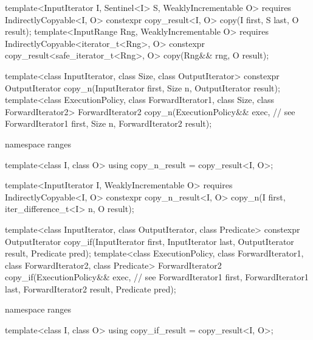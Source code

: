 \begin{addedblock}
\begin{codeblock}
{    template<InputIterator I, Sentinel<I> S, WeaklyIncrementable O>
      requires IndirectlyCopyable<I, O>
      constexpr copy_result<I, O>
        copy(I first, S last, O result);
    template<InputRange Rng, WeaklyIncrementable O>
      requires IndirectlyCopyable<iterator_t<Rng>, O>
      constexpr copy_result<safe_iterator_t<Rng>, O>
        copy(Rng&& rng, O result);
  }
\end{codeblock}\end{addedblock}\begin{codeblock}
  template<class InputIterator, class Size, class OutputIterator>
    constexpr OutputIterator copy_n(InputIterator first, Size n,
                                    OutputIterator result);
  template<class ExecutionPolicy, class ForwardIterator1, class Size,
           class ForwardIterator2>
    ForwardIterator2 copy_n(ExecutionPolicy&& exec, // see 
                            ForwardIterator1 first, Size n,
                            ForwardIterator2 result);
\end{codeblock}\begin{addedblock}\begin{codeblock}
  namespace ranges {
    template<class I, class O>
    using copy_n_result = copy_result<I, O>;

    template<InputIterator I, WeaklyIncrementable O>
      requires IndirectlyCopyable<I, O>
      constexpr copy_n_result<I, O>
        copy_n(I first, iter_difference_t<I> n, O result);
  }
\end{codeblock}\end{addedblock}\begin{codeblock}
  template<class InputIterator, class OutputIterator, class Predicate>
    constexpr OutputIterator copy_if(InputIterator first, InputIterator last,
                                     OutputIterator result, Predicate pred);
  template<class ExecutionPolicy, class ForwardIterator1, class ForwardIterator2,
           class Predicate>
    ForwardIterator2 copy_if(ExecutionPolicy&& exec, // see 
                             ForwardIterator1 first, ForwardIterator1 last,
                             ForwardIterator2 result, Predicate pred);
\end{codeblock}\begin{addedblock}\begin{codeblock}
  namespace ranges {
    template<class I, class O>
    using copy_if_result = copy_result<I, O>;

}
\end{codeblock}
\end{addedblock}
